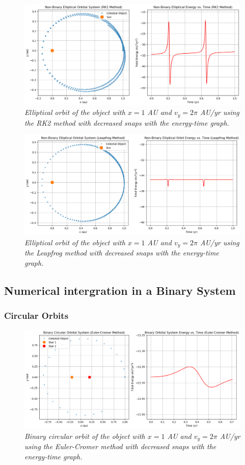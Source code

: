 \documentclass[11 pt, a4paper]{article}
\begin{document}
\begin{figure}[H]
  \includegraphics[width=0.7\linewidth]{RK2/rk2ellipticincrease.png}
  \centering
  \caption{\textit{Elliptical orbit of the object with $x = 1$ AU and $v_y = 2\pi$ AU/yr using the RK2 method with decreased snaps with the energy-time graph.}} 
\end{figure}

\begin{figure}[H]
  \includegraphics[width=0.7\linewidth]{Leapfrog/leapfrogellipticincrease.png}
  \centering
  \caption{\textit{Elliptical orbit of the object with $x = 1$ AU and $v_y = 2\pi$ AU/yr using the Leapfrog method with decreased snaps with the energy-time graph.}} 
\end{figure}

\subsection{Numerical intergration in a Binary System}
\subsubsection{Circular Orbits}

\begin{figure}[H]
  \includegraphics[width=0.7\linewidth]{binaryeulercircular.png}
  \centering
  \caption{\textit{Binary circular orbit of the object with $x = 1$ AU and $v_y = 2\pi$ AU/yr using the Euler-Cromer method with decreased snaps with the energy-time graph.}} 
\end{figure}
\end{document}
